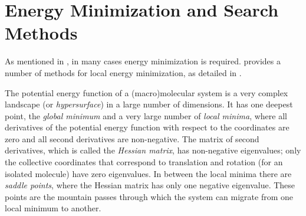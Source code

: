 \section{Energy Minimization and Search Methods}

As mentioned in , in many cases energy minimization
is required. {\gromacs} provides a number of methods for local energy
minimization, as detailed in .

The potential energy function of a (macro)molecular system is a very
complex landscape (or {\em hypersurface}) in a large number of
dimensions. It has one deepest point, the {\em global minimum} and a
very large number of {\em local minima}, where all derivatives of the
potential energy function with respect to the coordinates are zero and
all second derivatives are non-negative. The matrix of second
derivatives, which is called the {\em Hessian matrix}, has non-negative
eigenvalues; only the collective coordinates that correspond to
translation and rotation (for an isolated molecule) have zero
eigenvalues. In between the local minima there are {\em saddle
points}, where the Hessian matrix has only one negative
eigenvalue. These points are the mountain passes through which the
system can migrate from one local minimum to another.


